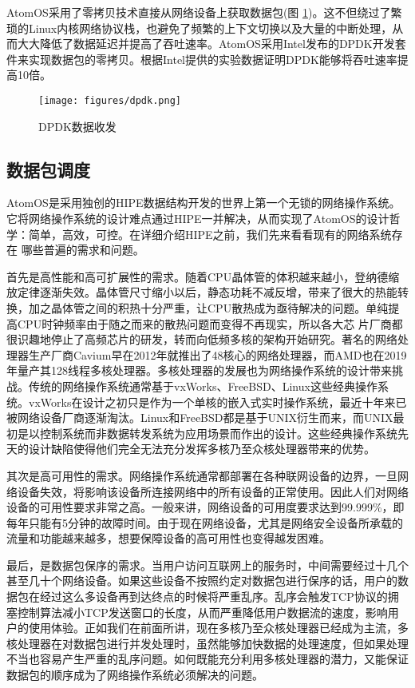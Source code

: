 \documentclass[a4paper]{article}
\begin{document}
AtomOS采用了零拷贝技术直接从网络设备上获取数据包(图 \ref{fig:dpdk})。这不但绕过了繁琐的Linux内核网络协议栈，也避免了频繁的上下文切换以及大量的中断处理，从而大大降低了数据延迟并提高了吞吐速率。AtomOS采用Intel发布的DPDK\cite{dpdk}开发套件来实现数据包的零拷贝。根据Intel提供的实验数据证明DPDK能够将吞吐速率提高10倍\cite{dpdk-performance}。

\begin{figure}[hhhh]
\centering
\texttt{[image: figures/dpdk.png]}
\caption{DPDK数据收发}
\label{fig:dpdk}
\end{figure}

\subsection{数据包调度}
AtomOS是采用独创的HIPE数据结构开发的世界上第一个无锁的网络操作系统。它将网络操作系统的设计难点通过HIPE一并解决，从而实现了AtomOS的设计哲学：简单，高效，可控。在详细介绍HIPE之前，我们先来看看现有的网络系统存在
哪些普遍的需求和问题。

首先是高性能和高可扩展性的需求。随着CPU晶体管的体积越来越小，登纳德缩放定律\cite{dennard1974design}逐渐失效。晶体管尺寸缩小以后，静态功耗不减反增，带来了很大的热能转换，加之晶体管之间的积热十分严重，让CPU散热成为亟待解决的问题。单纯提高CPU时钟频率由于随之而来的散热问题而变得不再现实，所以各大芯
片厂商都很识趣地停止了高频芯片的研发，转而向低频多核的架构开始研究。著名的网络处理器生产厂商Cavium早在2012年就推出了48核心的网络处理器\cite{cavium-48-core}，而AMD也在2019年量产其128线程多核处理器\cite{amd-64-core}。多核处理器的发展也为网络操作系统的设计带来挑战。传统的网络操作系统通常基于vxWorks、FreeBSD、Linux这些经典操作系统。vxWorks在设计之初只是作为一个单核的嵌入式实时操作系统，最近十年来已被网络设备厂商逐渐淘汰。Linux和FreeBSD都是基于UNIX衍生而来，而UNIX最初是以控制系统而非数据转发系统为应用场景而作出的设计。这些经典操作系统先天的设计缺陷使得他们完全无法充分发挥多核乃至众核处理器带来的优势。

其次是高可用性的需求。网络操作系统通常都部署在各种联网设备的边界，一旦网络设备失效，将影响该设备所连接网络中的所有设备的正常使用。因此人们对网络设备的可用性要求非常之高。一般来讲，网络设备的可用度要求达到99.999\%，即每年只能有5分钟的故障时间。由于现在网络设备，尤其是网络安全设备所承载的流量和功能越来越多，想要保障设备的高可用性也变得越发困难。

最后，是数据包保序的需求。当用户访问互联网上的服务时，中间需要经过十几个甚至几十个网络设备。如果这些设备不按照约定对数据包进行保序的话，用户的数据包在经过这么多设备再到达终点的时候将严重乱序。乱序会触发TCP协议的拥塞控制算法\cite{jacobson1988congestion}减小TCP发送窗口的长度，从而严重降低用户数据流的速度，影响用户的使用体验。正如我们在前面所讲，现在多核乃至众核处理器已经成为主流，多核处理器在对数据包进行并发处理时，虽然能够加快数据的处理速度，但如果处理不当也容易产生严重的乱序问题。如何既能充分利用多核处理器的潜力，又能保证数据包的顺序成为了网络操作系统必须解决的问题。
\end{document}
